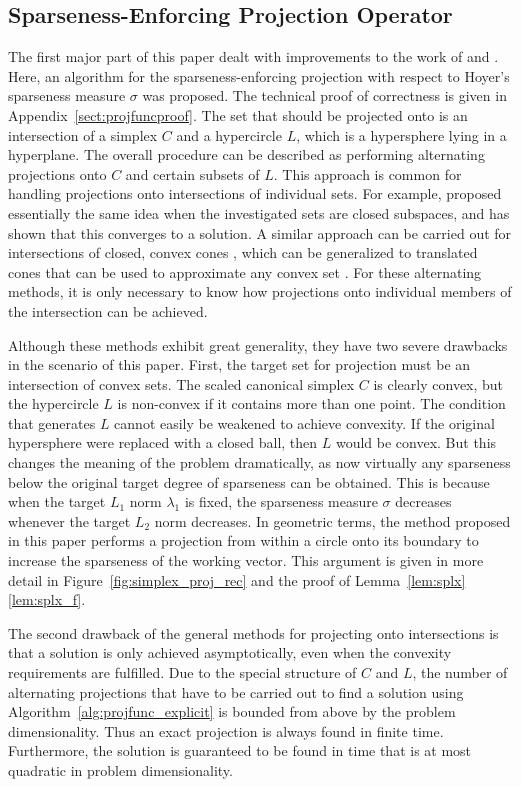 \documentclass[twoside,11pt]{article}
\newcommand{\0}{\mathcal{O}}
\begin{document}
\subsection{Sparseness-Enforcing Projection Operator}
\label{sect:relwork_projfunc}
The first major part of this paper dealt with improvements to the work of \citet{Hoyer2004} and \citet{Theis2005}.
Here, an algorithm for the sparseness-enforcing projection with respect to Hoyer's sparseness measure $\sigma$ was proposed.
The technical proof of correctness is given in Appendix~\ref{sect:projfuncproof}.
The set that should be projected onto is an intersection of a simplex $C$ and a hypercircle $L$, which is a hypersphere lying in a hyperplane.
The overall procedure can be described as performing alternating projections onto $C$ and certain subsets of $L$.
This approach is common for handling projections onto intersections of individual sets.
For example, \citet{Neumann1950} proposed essentially the same idea when the investigated sets are closed subspaces, and has shown that this converges to a solution.
A similar approach can be carried out for intersections of closed, convex cones \citep{Dykstra1983}, which can be generalized to translated cones that can be used to approximate any convex set \citep{Dykstra1987}.
For these alternating methods, it is only necessary to know how projections onto individual members of the intersection can be achieved.

Although these methods exhibit great generality, they have two severe drawbacks in the scenario of this paper.
First, the target set for projection must be an intersection of convex sets.
The scaled canonical simplex $C$ is clearly convex, but the hypercircle $L$ is non-convex if it contains more than one point.
The condition that generates $L$ cannot easily be weakened to achieve convexity.
If the original hypersphere were replaced with a closed ball, then $L$ would be convex.
But this changes the meaning of the problem dramatically, as now virtually any sparseness below the original target degree of sparseness can be obtained.
This is because when the target $L_1$ norm $\lambda_1$ is fixed, the sparseness measure $\sigma$ decreases whenever the target $L_2$ norm decreases.
In geometric terms, the method proposed in this paper performs a projection from within a circle onto its boundary to increase the sparseness of the working vector.
This argument is given in more detail in Figure~\ref{fig:simplex_proj_rec} and the proof of Lemma~\ref{lem:splx}\ref{lem:splx_f}.

The second drawback of the general methods for projecting onto intersections is that a solution is only achieved asymptotically, even when the convexity requirements are fulfilled.
Due to the special structure of $C$ and $L$, the number of alternating projections that have to be carried out to find a solution using Algorithm~\ref{alg:projfunc_explicit} is bounded from above by the problem dimensionality.
Thus an exact projection is always found in finite time.
Furthermore, the solution is guaranteed to be found in time that is at most quadratic in problem dimensionality.
\end{document}
